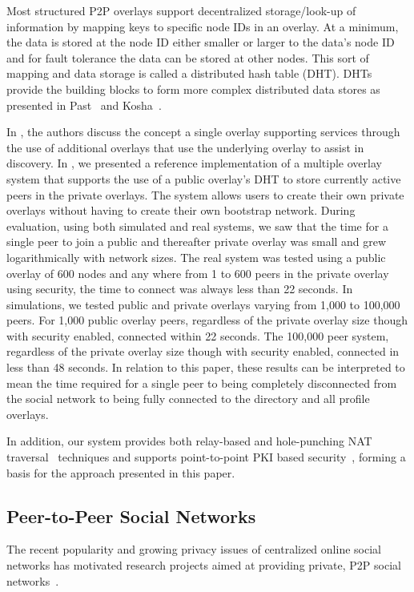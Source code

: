 \documentclass[letterpaper,twocolumn,10pt]{article}
\begin{document}
Most structured P2P overlays support decentralized storage/look-up of information by
mapping keys to specific node IDs in an overlay.  At a minimum, the data is stored
at the node ID either smaller or larger to the data's node ID and for fault
tolerance the data can be stored at other nodes.  This sort of mapping
and data storage is called a distributed hash table (DHT).  DHTs provide the
building blocks to form more complex distributed data stores as presented in
Past~\cite{past} and Kosha~\cite{kosha}.

In \cite{one_ring, can_multicast}, the authors discuss the concept a
single overlay supporting services through the use of additional overlays
that use the underlying overlay to assist in discovery.  In \cite{icdcs10}, we
presented a reference implementation of a multiple overlay system that supports
the use of a public overlay's DHT to store currently active peers in the private
overlays. The system allows users to create their own private overlays without
having to create their own bootstrap network.  During evaluation, using both
simulated and real systems, we saw that the time for a single peer to join a public
and thereafter private overlay was small and grew logarithmically with network
sizes.  The real system was tested using a public overlay of 600 nodes and any
where from 1 to 600 peers in the private overlay using security, the time to
connect was always less than 22 seconds.    In simulations, we tested public
and private overlays varying from 1,000 to 100,000 peers.  For 1,000 public
overlay peers, regardless of the private overlay size though with security enabled,
connected within 22 seconds.  The 100,000 peer system, regardless of the private
overlay size though with security enabled, connected in less than 48 seconds.  
In relation to this paper, these results can be interpreted to mean the time
required for a single peer to being completely disconnected from the social network
to being fully connected to the directory and all profile overlays.

In addition, our system provides both relay-based and hole-punching NAT
traversal~\cite{nsdi10} techniques and supports point-to-point
PKI based security~\cite{icdcs10}, forming a basis for the approach
presented in this paper.

\subsection{Peer-to-Peer Social Networks}
The recent popularity and growing privacy issues of centralized online social
networks has motivated research projects aimed at providing private, P2P social
networks~\cite{peerson, matryoshka, tribler-osn, vis-a-vis}.
\end{document}
